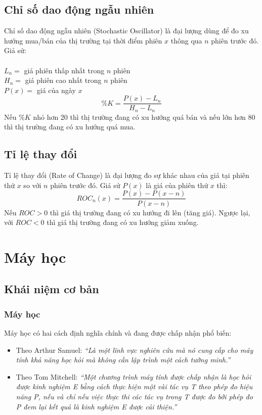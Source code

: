 \subsection{Chỉ số dao động ngẫu nhiên}
Chỉ số dao động ngẫu nhiên (Stochastic Oscillator) là đại lượng dùng để đo xu 
hướng mua/bán của thị trường tại thời điểm phiên $x$ thông qua $n$ phiên trước 
đó. Giả sử:\\\\
\tab $L_{n} = $ giá phiên thấp nhất trong $n$ phiên\\
\tab $H_{n} = $ giá phiên cao nhất trong $n$ phiên\\
\tab $P(x) = $ giá của ngày $x$\\
\[\%K=\frac{P(x)-L_{n}}{H_{n}-L_{n}}\]
Nếu $ \%K $ nhỏ hơn 20 thì thị trường đang có xu hướng quá bán và nếu lớn hơn 
80 thì thị trường đang có xu hướng quá mua.
\subsection{Tỉ lệ thay đổi}
Tỉ lệ thay đổi (Rate of Change) là đại lượng đo sự khác nhau của giá tại phiên 
thứ $x$ so với $n$ phiên trước đó. Giá sử $P(x)$ là giá của phiên thứ $x$ thì:
\[ ROC_{n}(x)=\frac{P(x)-P(x-n)}{P(x-n)}\]
Nếu $ROC > 0$ thì giá thị trường đang có xu hướng đi lên (tăng giá).
Ngược lại, với $ROC < 0$ thì giá thị trường đang có xu hướng giảm xuống.
\section{Máy học}
\subsection{Khái niệm cơ bản}
\subsubsection{Máy học}
Máy học có hai cách định nghĩa chính và đang được chấp nhận phổ biến:
\begin{itemize}
\item Theo Arthur Samuel: \textit{``Là một lĩnh vực nghiên cứu mà nó cung cấp 
cho máy tính khả năng học hỏi mà không cần lập trình một cách tường minh.''}
\item Theo Tom Mitchell: \textit{``Một chương trình máy tính được chấp nhận là 
học hỏi được kinh nghiệm E bằng cách thực hiện một vài tác vụ T theo phép đo hiệu
năng P, nếu và chỉ nếu việc thực thi các tác vụ trong T được đo bởi phép đo P
đem lại kết quả là kinh nghiệm E được cải thiện.''}
\end{itemize}
